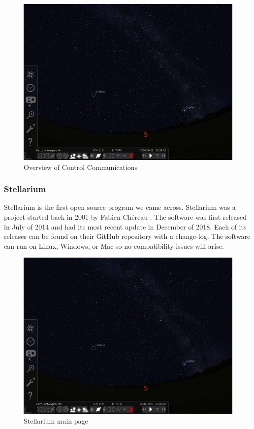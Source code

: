 \documentclass[12pt]{report}
\begin{document}
\begin{figure}[h]
	\centering
	\includegraphics[width=0.75\linewidth]{stell}
	\caption{Overview of Control Communications}
\end{figure}

\subsubsection*{Stellarium}

Stellarium is the first open source program we came across. Stellarium was a project started back in 2001 by Fabien Chéreau \cite{stell}. The software was first released in July of 2014 and had its most recent update in December of 2018. Each of its releases can be found on their GitHub repository with a change-log. The software can run on Linux, Windows, or Mac so no compatibility issues will arise.

\begin{figure}[h]
	\centering
	\includegraphics[width=0.75\linewidth]{stell}
	\caption{Stellarium main page}
\end{figure}
\end{document}
